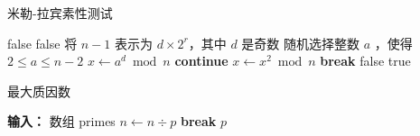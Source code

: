 \begin{algorithm}
	\caption{米勒-拉宾素性测试}
	\begin{algorithmic}[1]
		 
		\Return false
		\EndIf
		\Return false
		\EndIf
		\State 将 \( n - 1 \) 表示为 \( d \times 2^r \)，其中 \( d \) 是奇数
		\State 随机选择整数 \( a \) ，使得 \( 2 \leqslant a \leqslant n-2 \)
		\State \( x \gets a^d \bmod n \)
		\textbf{continue}
		\EndIf
		\State \( x \gets x^2 \bmod n \)
		\textbf{break}
		\EndIf
		\EndFor
		\Return false
		\EndIf
		\EndFor
		\Return true
		\EndFunction
	\end{algorithmic}
\end{algorithm}

\begin{algorithm}
	\caption{最大质因数}
	\begin{algorithmic}[1]
		\State \textbf{输入：} 数组 primes
		\State \( n \gets n \div p \)
		\EndWhile
		\State \textbf{break}
		\EndIf
		\EndFor
		\Return \( p \)
		\EndFunction
	\end{algorithmic}
\end{algorithm}
